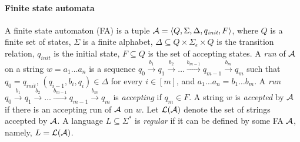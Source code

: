 \paragraph{Finite state automata}
A finite state automaton (FA) is a tuple 
$\mathcal{A}=\langle Q,\Sigma,\Delta, q_{\textit{init}}, F\rangle$, 
where $Q$ is a finite set of states, 
$\Sigma$ is a finite alphabet,
$\Delta\subseteq Q\times \Sigma_\epsilon\times Q$ is the transition relation, 
$q_{\textit{init}}$ is the initial state, $F \subseteq Q$ is the set of accepting states. 
A \emph{run} of $\mathcal{A}$ on a string $w = a_1 \ldots a_n$ is a sequence $q_0 \xrightarrow{b_1} q_1  \xrightarrow{b_2}  \ldots   \xrightarrow{b_{m-1}}  q_{m-1} \xrightarrow{b_m} q_m$ such that $q_0 = q_{\textit{init}}$, $(q_{i-1}, b_i, q_i) \in \Delta$ for every $i \in [m]$, and $a_1 \ldots a_n = b_1 \ldots b_m$. A \emph{run} $q_0 \xrightarrow{b_1} q_1  \xrightarrow{b_2}  \ldots   \xrightarrow{b_{m-1}}  q_{m-1} \xrightarrow{b_m} q_m$ is \emph{accepting} if $q_m  \in F$. A string $w$ is \emph{accepted} by $\mathcal{A}$ if there is an accepting run of $\mathcal{A}$ on $w$. Let $\mathcal{L}(\mathcal{A})$ denote the set of strings accepted by $\mathcal{A}$. A language $L \subseteq \Sigma^*$ is \emph{regular} if it can be defined by some FA $\mathcal{A}$, namely, $L = \mathcal{L}(\mathcal{A})$.




